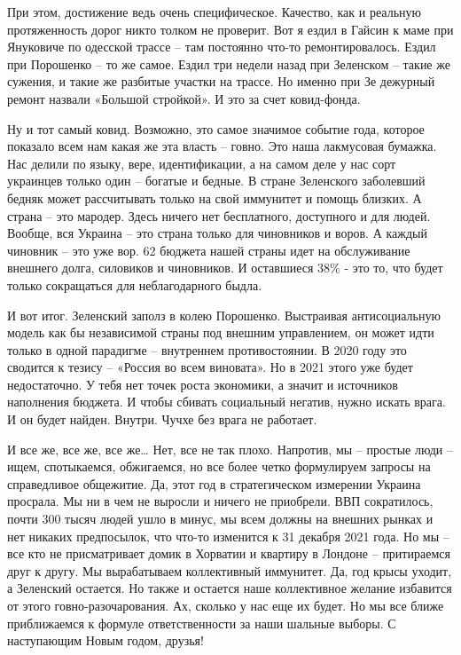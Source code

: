 При этом, достижение ведь очень специфическое. Качество, как и реальную
протяженность дорог никто толком не проверит. Вот я ездил в Гайсин к маме при
Януковиче по одесской трассе – там постоянно что-то ремонтировалось. Ездил при
Порошенко – то же самое. Ездил три недели назад при Зеленском – такие же
сужения, и такие же разбитые участки на трассе. Но именно при Зе дежурный
ремонт назвали «Большой стройкой». И это за счет ковид-фонда.

Ну и тот самый ковид. Возможно, это самое значимое событие года, которое
показало всем нам какая же эта власть – говно. Это наша лакмусовая бумажка. Нас
делили по языку, вере, идентификации, а на самом деле у нас сорт украинцев
только один – богатые и бедные. В стране Зеленского заболевший бедняк может
рассчитывать только на свой иммунитет и помощь близких. А страна – это мародер.
Здесь ничего нет бесплатного, доступного и для людей. Вообще, вся Украина – это
страна только для чиновников и воров. А каждый чиновник – это уже вор. 62%
бюджета нашей страны идет на обслуживание внешнего долга, силовиков и
чиновников. И оставшиеся 38\% - это то, что будет только сокращаться для
неблагодарного быдла.

И вот итог. Зеленский заполз в колею Порошенко. Выстраивая антисоциальную
модель как бы независимой страны под внешним управлением, он может идти только
в одной парадигме – внутреннем противостоянии. В 2020 году это сводится к
тезису – «Россия во всем виновата». Но в 2021 этого уже будет недостаточно. У
тебя нет точек роста экономики, а значит и источников наполнения бюджета. И
чтобы сбивать социальный негатив, нужно искать врага. И он будет найден.
Внутри. Чучхе без врага не работает.

И все же, все же, все же… Нет, все не так плохо. Напротив, мы – простые люди –
ищем, спотыкаемся, обжигаемся, но все более четко формулируем запросы на
справедливое общежитие. Да, этот год в стратегическом измерении Украина
просрала. Мы ни в чем не выросли и ничего не приобрели. ВВП сократилось, почти
300 тысяч людей ушло в минус, мы всем должны на внешних рынках и нет никаких
предпосылок, что что-то изменится к 31 декабря 2021 года. Но мы – все кто не
присматривает домик в Хорватии и квартиру в Лондоне – притираемся друг к другу.
Мы вырабатываем коллективный иммунитет. Да, год крысы уходит, а Зеленский
остается. Но также и остается наше коллективное желание избавится от этого
говно-разочарования. Ах, сколько у нас еще их будет. Но мы все ближе
приближаемся к формуле ответственности за наши шальные выборы. С наступающим
Новым годом, друзья!

